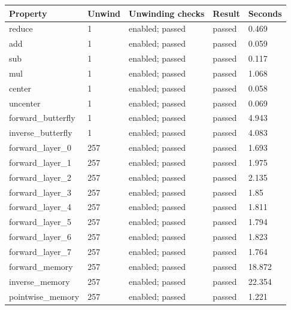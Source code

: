 \begin{tabular}{lllll}
\hline
Property & Unwind & Unwinding checks & Result & Seconds \\
\hline
reduce & 1 & enabled; passed & passed & 0.469 \\
add & 1 & enabled; passed & passed & 0.059 \\
sub & 1 & enabled; passed & passed & 0.117 \\
mul & 1 & enabled; passed & passed & 1.068 \\
center & 1 & enabled; passed & passed & 0.058 \\
uncenter & 1 & enabled; passed & passed & 0.069 \\
forward\_butterfly & 1 & enabled; passed & passed & 4.943 \\
inverse\_butterfly & 1 & enabled; passed & passed & 4.083 \\
forward\_layer\_0 & 257 & enabled; passed & passed & 1.693 \\
forward\_layer\_1 & 257 & enabled; passed & passed & 1.975 \\
forward\_layer\_2 & 257 & enabled; passed & passed & 2.135 \\
forward\_layer\_3 & 257 & enabled; passed & passed & 1.85 \\
forward\_layer\_4 & 257 & enabled; passed & passed & 1.811 \\
forward\_layer\_5 & 257 & enabled; passed & passed & 1.794 \\
forward\_layer\_6 & 257 & enabled; passed & passed & 1.823 \\
forward\_layer\_7 & 257 & enabled; passed & passed & 1.764 \\
forward\_memory & 257 & enabled; passed & passed & 18.872 \\
inverse\_memory & 257 & enabled; passed & passed & 22.354 \\
pointwise\_memory & 257 & enabled; passed & passed & 1.221 \\
\hline
\end{tabular}
